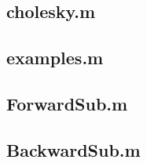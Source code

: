 \documentclass[12pt]{article}
\begin{document}
\subsection{cholesky.m}


\subsection{examples.m}


\subsection{ForwardSub.m}


\subsection{BackwardSub.m}


\end{document}
